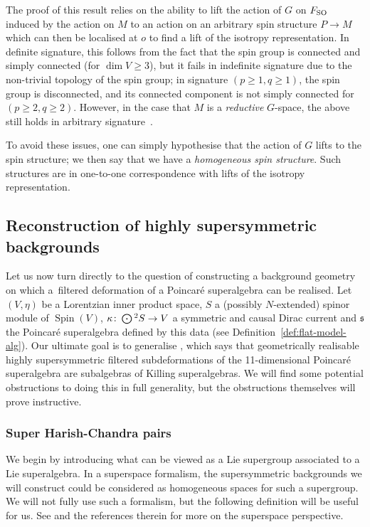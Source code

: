 \documentclass[pdftex]{sigma}
\numberwithin{equation}{section}
\newcommand{\fs}{\mathfrak{s}}
\newcommand{\Odot}{\mathchoice{{\textstyle\bigodot}}{\bigodot}{\bigodot}{\bigodot}}
\newcommand{\1}{\mathbbm{1}}
\DeclareMathOperator{\Spin}{Spin}
\begin{document}
The proof of this result relies on the ability to lift the action of $G$ on $F_{\rm SO}$ induced by the action on $M$ to an action on an arbitrary spin structure $P\to M$ which can then be localised at $o$ to find a lift of the isotropy representation. In definite signature, this follows from the fact that the spin group is connected and simply connected (for $\dim V \geq 3$), but it fails in indefinite signature due to the non-trivial topology of the spin group; in signature $(p\geq 1,q\geq 1)$, the spin group is disconnected, and its connected component is not simply connected for $(p\geq 2,q\geq 2)$. However, in the case that $M$ is a \emph{reductive} $G$-space, the above still holds in arbitrary signature~\cite{Alekseevsky2019,Cahen1993}.

To avoid these issues, one can simply hypothesise that the action of $G$ lifts to the spin structure; we then say that we have a \emph{homogeneous spin structure}. Such structures are in one-to-one correspondence with lifts of the isotropy representation.

\subsection{Reconstruction of highly supersymmetric backgrounds}
\label{sec:high-susy-spin-mfld-homogeneous}

Let us now turn directly to the question of constructing a background geometry on which a~filtered deformation of a Poincar\'e superalgebra can be realised. Let $(V,\eta)$ be a Lorentzian inner product space, $S$ a (possibly $N$-extended) spinor module of $\Spin(V)$, $\kappa\colon \Odot^2 S\to V$ a symmetric and causal Dirac current and $\fs$ the Poincar\'e superalgebra defined by this data (see Definition~\ref{def:flat-model-alg}). Our ultimate goal is to generalise \cite[Theorem~13]{Figueroa-OFarrill2017_1}, which says that geometrically realisable highly supersymmetric filtered subdeformations of the 11-dimensional Poincar\'e superalgebra are subalgebras of Killing superalgebras. We will find some potential obstructions to doing this in full generality, but the obstructions themselves will prove instructive.

\subsubsection{Super Harish-Chandra pairs}

We begin by introducing what can be viewed as a Lie supergroup associated to a Lie superalgebra. In a superspace formalism, the supersymmetric backgrounds we will construct could be considered as homogeneous spaces for such a supergroup. We will not fully use such a formalism, but the following definition will be useful for us. See \cite{Santi2010} and the references therein for more on the superspace perspective.
\end{document}
